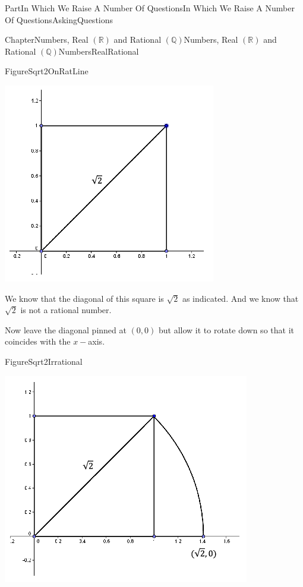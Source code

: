 \documentclass[oneside,10pt,]{book}
\numberwithin{equation}{part}
\newcommand{\RR}{\mathbb {R}}
\newcommand{\QQ}{\mathbb {Q}}
\begin{document}
\begin{partptx}{Part}{In Which We Raise A Number Of Questions}{}{In Which We Raise A Number Of Questions}{}{}{AskingQuestions}
\begin{chapterptx}{Chapter}{Numbers, Real \(\left(\RR\right)\) and Rational \(\left(\QQ\right)\)}{}{Numbers, Real \(\left(\RR\right)\) and Rational \(\left(\QQ\right)\)}{}{}{NumbersRealRational}
\begin{figureptx}{Figure}{}{Sqrt2OnRatLine}{}
\begin{image}{0.25}{0.5}{0.25}{}
\includegraphics[width=\linewidth]{external/images/Sqrt2OnRatLine.png}
\end{image}%
\tcblower
\end{figureptx}%
We know that the diagonal of this square is \(\sqrt{2}\) as indicated.  And we know that \(\sqrt{2}\) is not a rational number.%
\par
Now leave the diagonal pinned at \((0,0)\) but allow it to rotate down so that it coincides with the \(x-\)axis.%
\begin{figureptx}{Figure}{}{Sqrt2Irrational}{}%
\begin{image}{0.25}{0.5}{0.25}{}%
\includegraphics[width=\linewidth]{external/images/Sqrt2Irrational.png}

\end{image}
\end{figureptx}
\end{chapterptx}
\end{partptx}
\end{document}
